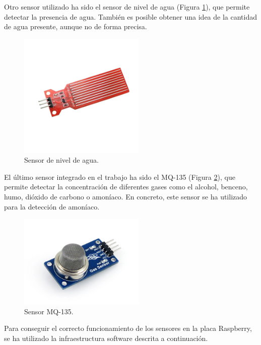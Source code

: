 Otro sensor utilizado ha sido el sensor de nivel de agua (Figura \ref{fig:nivel_of}), que permite detectar la presencia de agua. También es posible obtener una idea de la cantidad de agua presente, aunque no de forma precisa.
\begin{figure} [h!]
  \begin{center}
    \includegraphics[width=6cm]{figs/nivel_of}
  \end{center}
  \caption{Sensor de nivel de agua.}
  \label{fig:nivel_of}
\end{figure}

El último sensor integrado en el trabajo ha sido el MQ-135 (Figura \ref{fig:mq_of}), que permite detectar la concentración de diferentes gases como el alcohol, benceno, humo, dióxido de carbono o amoníaco. En concreto, este sensor se ha utilizado para la detección de amoníaco.\\
\begin{figure} [h!]
  \begin{center}
    \includegraphics[width=6cm]{figs/mq_of}
  \end{center}
  \caption{Sensor MQ-135.}
  \label{fig:mq_of}
\end{figure}

Para conseguir el correcto funcionamiento de los sensores en la placa Raspberry, se ha utilizado la infraestructura software descrita a continuación.\\

